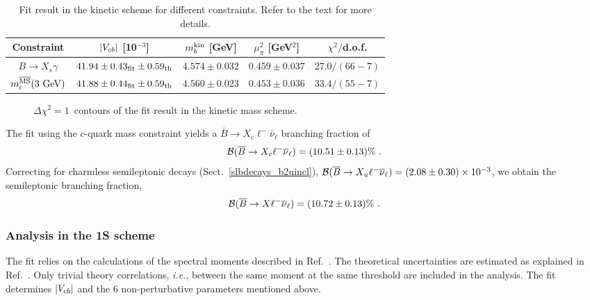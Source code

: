 \begin{table}[!htb]
\caption{Fit result in the kinetic scheme for different
  constraints. Refer to the text for more
  details.} \label{tab:gf_res_kin}
\begin{center}
\begin{tabular}{|c|c|c|c|c|}
  \hline
  Constraint & $|V_{cb}|$ [10$^{-3}$] & $m_b^{\rm kin}$ [GeV] &
  $\mu^2_\pi$ [GeV$^2$] & $\chi^2/$d.o.f.\\
  \hline \hline
  $B\to X_s\gamma$ & $41.94\pm 0.43_{\rm fit}\pm 0.59_{\rm th}$ &
  $4.574\pm 0.032$ & $0.459\pm 0.037$ & $27.0/(66-7)$\\
  $m_c^{\overline{\rm MS}}(3~{\rm GeV})$ & $41.88\pm 0.44_{\rm fit}\pm
  0.59_{\rm th}$ & $4.560\pm 0.023$ & $0.453\pm 0.036$ &
  $33.4/(55-7)$\\
  \hline
\end{tabular}
\end{center}
\end{table}
\begin{figure}
\begin{center}
\end{center}
\caption{$\Delta\chi^2=1$~contours of the fit result in the kinetic mass
  scheme.} \label{fig:gf_res_kin}
\end{figure}

The fit using the $c$-quark mass constraint yields a $\bar B\to
X_c\ell^-\bar\nu_\ell$ branching fraction of
\begin{equation}
  \cbf(\bar B\to X_c\ell^-\bar\nu_\ell)=(10.51\pm 0.13)\%~.
\end{equation}
Correcting for charmless semileptonic decays
(Sect.~\ref{slbdecays_b2uincl}), $\cbf(\bar B\to
X_u\ell^-\bar\nu_\ell)=(2.08\pm 0.30)\times 10^{-3}$, we obtain the
semileptonic branching fraction,
\begin{equation}
  \cbf(\bar B\to X\ell^-\bar\nu_\ell)=(10.72\pm 0.13)\%~.
\end{equation}

\subsubsection{Analysis in the 1S scheme}
\label{globalfits1S}

The fit relies on the calculations of the spectral moments described in
Ref.~\cite{Bauer:2004ve}. The theoretical uncertainties are estimated
as explained in Ref.~\cite{Schwanda:2008kw}. Only trivial theory
correlations, {\it i.e.}, between the same moment at the same
threshold are included in the analysis. The fit determines $|V_{cb}|$ and
the 6 non-perturbative parameters mentioned above.

